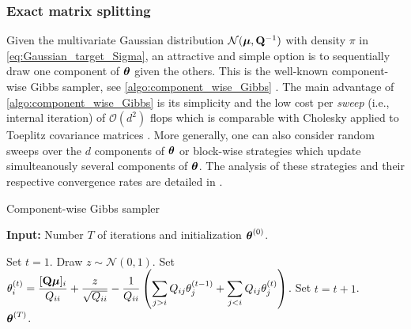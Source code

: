 \documentclass[nohypdvips,onefignum,onetabnum]{siamart171218}
\begin{document}
\subsubsection{Exact matrix splitting} \label{subsec:matrix_split_exact}
Given the multivariate Gaussian distribution $\mathcal{N}(\boldsymbol{\mu},\mathbf{Q}^{-1})$ with density $\pi$ in \cref{eq:Gaussian_target_Sigma}, an attractive and simple option is to sequentially draw one component of $\boldsymbol{\theta}$ given the others.
This is the well-known component-wise Gibbs sampler, see \cref{algo:component_wise_Gibbs} \cite{Geman1984,Gelman95,Rue2005}.
The main advantage of \cref{algo:component_wise_Gibbs} is its simplicity and the low cost per \textit{sweep} (i.e., internal iteration) of $\mathcal{O}(d^2)$ flops which is comparable with Cholesky applied to Toeplitz covariance matrices \cite{Trench1964}.
More generally, one can also consider random sweeps over the $d$ components of $\boldsymbol{\theta}$ or block-wise strategies which update simulteanously several components of $\boldsymbol{\theta}$.
The analysis of these strategies and their respective convergence rates are detailed in \cite{RobertsSahu1997}.
%
\begin{algorithm}
\caption{Component-wise Gibbs sampler}
\label{algo:component_wise_Gibbs}
\hspace*{\algorithmicindent} \textbf{Input:} Number $T$ of iterations and initialization $\boldsymbol{\theta}^{(0)}$.
\begin{algorithmic}[1]
\State Set $t = 1$.
    \State Draw $z \sim \mathcal{N}(0,1)$.
    \State Set $\theta^{(t)}_i = \dfrac{[\mathbf{Q}\boldsymbol{\mu}]_i}{Q_{ii}} + \dfrac{z}{\sqrt{Q_{ii}}} - \dfrac{1}{Q_{ii}}\left(\displaystyle\sum_{j > i}Q_{ij}\theta_j^{(t-1)} + \displaystyle\sum_{j < i}Q_{ij}\theta_j^{(t)}\right)$.
  \EndFor
  \State Set $t = t + 1$.
\EndWhile\\
\Return $\boldsymbol{\theta}^{(T)}$.
\end{algorithmic}
\end{algorithm}
%
\end{document}
